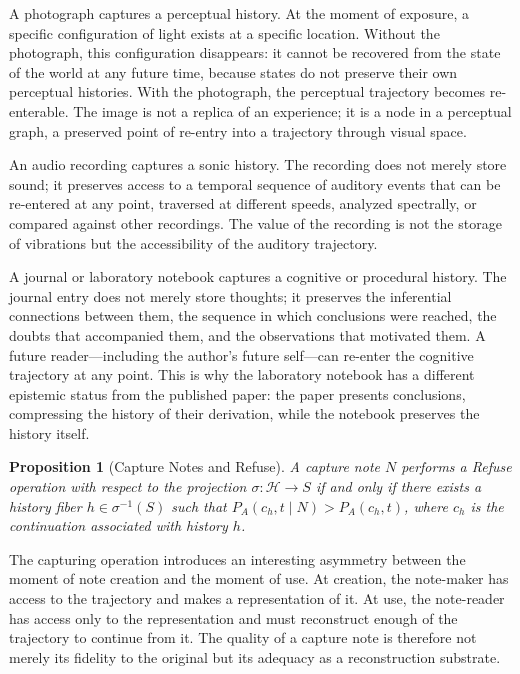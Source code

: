 \documentclass[12pt, a4paper]{article}
\theoremstyle{plain}
\newtheorem{proposition}[theorem]{Proposition}
\theoremstyle{definition}
\theoremstyle{remark}
\begin{document}
A photograph captures a perceptual history. At the moment of exposure, a specific
configuration of light exists at a specific location. Without the photograph, this
configuration disappears: it cannot be recovered from the state of the world at
any future time, because states do not preserve their own perceptual histories.
With the photograph, the perceptual trajectory becomes re-enterable. The image is
not a replica of an experience; it is a node in a perceptual graph, a preserved
point of re-entry into a trajectory through visual space.

An audio recording captures a sonic history. The recording does not merely store
sound; it preserves access to a temporal sequence of auditory events that can be
re-entered at any point, traversed at different speeds, analyzed spectrally, or
compared against other recordings. The value of the recording is not the storage
of vibrations but the accessibility of the auditory trajectory.

A journal or laboratory notebook captures a cognitive or procedural history. The
journal entry does not merely store thoughts; it preserves the inferential
connections between them, the sequence in which conclusions were reached, the
doubts that accompanied them, and the observations that motivated them. A future
reader---including the author's future self---can re-enter the cognitive trajectory
at any point. This is why the laboratory notebook has a different epistemic status
from the published paper: the paper presents conclusions, compressing the history
of their derivation, while the notebook preserves the history itself.

\begin{proposition}[Capture Notes and Refuse]
A capture note $N$ performs a Refuse operation with respect to the projection
$\sigma : \mathcal{H} \to S$ if and only if there exists a history fiber
$h \in \sigma^{-1}(S)$ such that $P_A(c_h, t \mid N) > P_A(c_h, t)$,
where $c_h$ is the continuation associated with history $h$.
\end{proposition}

The capturing operation introduces an interesting asymmetry between the moment of
note creation and the moment of use. At creation, the note-maker has access to the
trajectory and makes a representation of it. At use, the note-reader has access
only to the representation and must reconstruct enough of the trajectory to
continue from it. The quality of a capture note is therefore not merely its
fidelity to the original but its adequacy as a reconstruction substrate.
\end{document}
